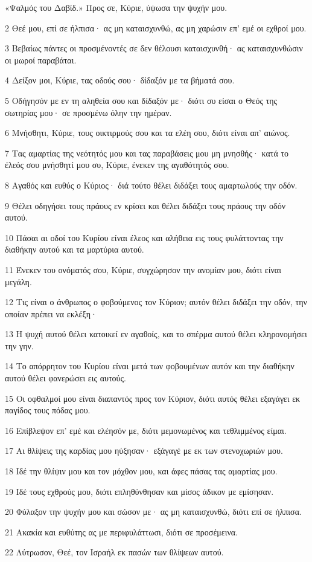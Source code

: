 \par «Ψαλμός του Δαβίδ.» Προς σε, Κύριε, ύψωσα την ψυχήν μου.
\par 2 Θεέ μου, επί σε ήλπισα· ας μη καταισχυνθώ, ας μη χαρώσιν επ' εμέ οι εχθροί μου.
\par 3 Βεβαίως πάντες οι προσμένοντές σε δεν θέλουσι καταισχυνθή· ας καταισχυνθώσιν οι μωροί παραβάται.
\par 4 Δείξον μοι, Κύριε, τας οδούς σου· δίδαξόν με τα βήματά σου.
\par 5 Οδήγησόν με εν τη αληθεία σου και δίδαξόν με· διότι συ είσαι ο Θεός της σωτηρίας μου· σε προσμένω όλην την ημέραν.
\par 6 Μνήσθητι, Κύριε, τους οικτιρμούς σου και τα ελέη σου, διότι είναι απ' αιώνος.
\par 7 Τας αμαρτίας της νεότητός μου και τας παραβάσεις μου μη μνησθής· κατά το έλεός σου μνήσθητί μου συ, Κύριε, ένεκεν της αγαθότητός σου.
\par 8 Αγαθός και ευθύς ο Κύριος· διά τούτο θέλει διδάξει τους αμαρτωλούς την οδόν.
\par 9 Θέλει οδηγήσει τους πράους εν κρίσει και θέλει διδάξει τους πράους την οδόν αυτού.
\par 10 Πάσαι αι οδοί του Κυρίου είναι έλεος και αλήθεια εις τους φυλάττοντας την διαθήκην αυτού και τα μαρτύρια αυτού.
\par 11 Ένεκεν του ονόματός σου, Κύριε, συγχώρησον την ανομίαν μου, διότι είναι μεγάλη.
\par 12 Τις είναι ο άνθρωπος ο φοβούμενος τον Κύριον; αυτόν θέλει διδάξει την οδόν, την οποίαν πρέπει να εκλέξη·
\par 13 Η ψυχή αυτού θέλει κατοικεί εν αγαθοίς, και το σπέρμα αυτού θέλει κληρονομήσει την γην.
\par 14 Το απόρρητον του Κυρίου είναι μετά των φοβουμένων αυτόν και την διαθήκην αυτού θέλει φανερώσει εις αυτούς.
\par 15 Οι οφθαλμοί μου είναι διαπαντός προς τον Κύριον, διότι αυτός θέλει εξαγάγει εκ παγίδος τους πόδας μου.
\par 16 Επίβλεψον επ' εμέ και ελέησόν με, διότι μεμονωμένος και τεθλιμμένος είμαι.
\par 17 Αι θλίψεις της καρδίας μου ηύξησαν· εξάγαγέ με εκ των στενοχωριών μου.
\par 18 Ιδέ την θλίψιν μου και τον μόχθον μου, και άφες πάσας τας αμαρτίας μου.
\par 19 Ιδέ τους εχθρούς μου, διότι επληθύνθησαν και μίσος άδικον με εμίσησαν.
\par 20 Φύλαξον την ψυχήν μου και σώσον με· ας μη καταισχυνθώ, διότι επί σε ήλπισα.
\par 21 Ακακία και ευθύτης ας με περιφυλάττωσι, διότι σε προσέμεινα.
\par 22 Λύτρωσον, Θεέ, τον Ισραήλ εκ πασών των θλίψεων αυτού.

